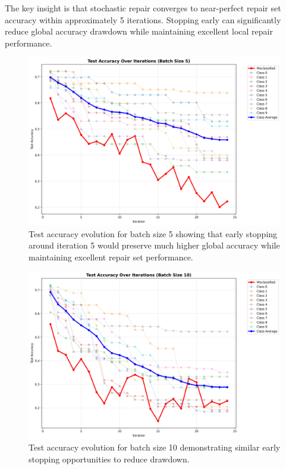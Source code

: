 \documentclass{article}
\begin{document}
\begin{description}
The key insight is that stochastic repair converges to near-perfect repair set accuracy within approximately 5 iterations. Stopping early can significantly reduce global accuracy drawdown while maintaining excellent local repair performance.

\begin{figure}[h]
	\centering
	\includegraphics[width=\textwidth]{results/stochastic_analysis/batch_iterations/test_accuracy_batch_5.png}
	\caption{Test accuracy evolution for batch size 5 showing that early stopping around iteration 5 would preserve much higher global accuracy while maintaining excellent repair set performance.}
	\label{fig:early_stopping_batch_5}
\end{figure}

\begin{figure}[h]
	\centering
	\includegraphics[width=\textwidth]{results/stochastic_analysis/batch_iterations/test_accuracy_batch_10.png}
	\caption{Test accuracy evolution for batch size 10 demonstrating similar early stopping opportunities to reduce drawdown.}
	\label{fig:early_stopping_batch_10}
\end{figure}


\end{description}
\end{document}
